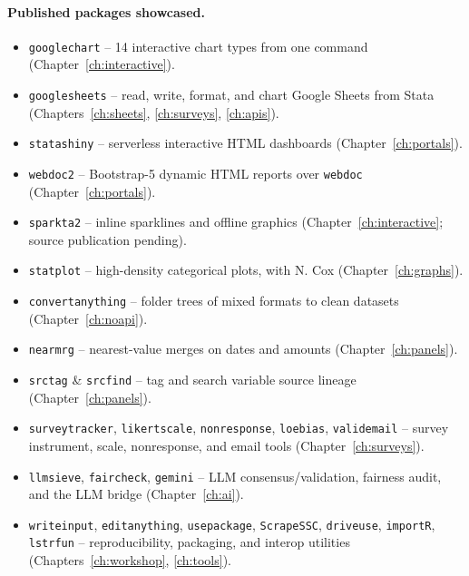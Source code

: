 \documentclass[
    a4paper,
    fontsize=10pt,
    twoside=true,
    numbers=noenddot,
]{kaobook}
\begin{document}
\paragraph{Published packages showcased.}
\begin{itemize}
    \item \texttt{googlechart} -- 14 interactive chart types from one command (Chapter~\ref{ch:interactive}).
    \item \texttt{googlesheets} -- read, write, format, and chart Google Sheets from Stata (Chapters~\ref{ch:sheets}, \ref{ch:surveys}, \ref{ch:apis}).
    \item \texttt{statashiny} -- serverless interactive HTML dashboards (Chapter~\ref{ch:portals}).
    \item \texttt{webdoc2} -- Bootstrap-5 dynamic HTML reports over \texttt{webdoc} (Chapter~\ref{ch:portals}).
    \item \texttt{sparkta2} -- inline sparklines and offline graphics (Chapter~\ref{ch:interactive}; source publication pending).
    \item \texttt{statplot} -- high-density categorical plots, with N. Cox (Chapter~\ref{ch:graphs}).
    \item \texttt{convertanything} -- folder trees of mixed formats to clean datasets (Chapter~\ref{ch:noapi}).
    \item \texttt{nearmrg} -- nearest-value merges on dates and amounts (Chapter~\ref{ch:panels}).
    \item \texttt{srctag} \& \texttt{srcfind} -- tag and search variable source lineage (Chapter~\ref{ch:panels}).
    \item \texttt{surveytracker}, \texttt{likertscale}, \texttt{nonresponse}, \texttt{loebias}, \texttt{validemail} -- survey instrument, scale, nonresponse, and email tools (Chapter~\ref{ch:surveys}).
    \item \texttt{llmsieve}, \texttt{faircheck}, \texttt{gemini} -- LLM consensus/validation, fairness audit, and the LLM bridge (Chapter~\ref{ch:ai}).
    \item \texttt{writeinput}, \texttt{editanything}, \texttt{usepackage}, \texttt{ScrapeSSC}, \texttt{driveuse}, \texttt{importR}, \texttt{lstrfun} -- reproducibility, packaging, and interop utilities (Chapters~\ref{ch:workshop}, \ref{ch:tools}).
\end{itemize}
\end{document}
